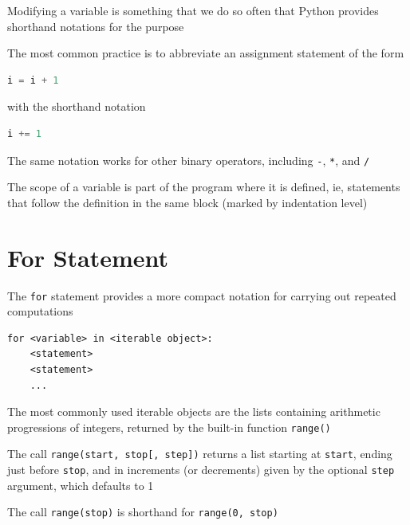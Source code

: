 \documentclass[8pt,a4paper,compress]{beamer}
\begin{document}
\begin{frame}[fragile]
\pause

Modifying a variable is something that we do so often that Python provides shorthand notations for the purpose

\pause
\bigskip

The most common practice is to abbreviate an assignment statement of the form 

\begin{lstlisting}[language=Python]
i = i + 1
\end{lstlisting}

with the shorthand notation

\begin{lstlisting}[language=Python]
i += 1
\end{lstlisting}

\pause
\bigskip

The same notation works for other binary operators, including \lstinline{-}, \lstinline{*}, and \lstinline{/}

\pause
\bigskip

The scope of a variable is part of the program where it is defined, ie, statements that follow the definition in the same block (marked by indentation level)
\end{frame}

\section{For Statement}
\begin{frame}[fragile]
\pause

The \lstinline{for} statement provides a more compact notation for carrying out repeated computations

\pause
\smallskip

\begin{lstlisting}[language={}]
for <variable> in <iterable object>:
    <statement>
    <statement>
    ...
\end{lstlisting}

\pause
\bigskip

The most commonly used iterable objects are the lists containing arithmetic progressions of integers, returned by the built-in function \lstinline{range()}

\pause
\bigskip

The call \lstinline{range(start, stop[, step])} returns a list starting at \lstinline{start}, ending just before \lstinline{stop}, and in increments (or decrements) given by the optional \lstinline{step} argument, which defaults to 1

\pause
\bigskip

The call \lstinline{range(stop)} is shorthand for \lstinline{range(0, stop)}
\end{frame}
\end{document}
